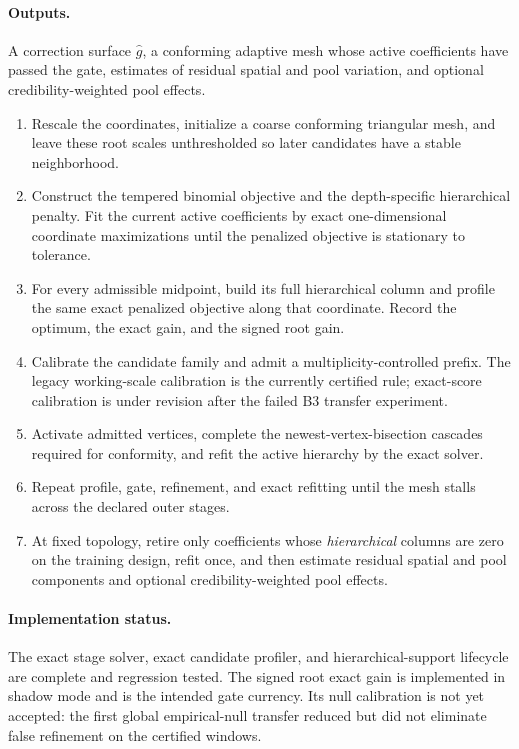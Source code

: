 \documentclass[11pt]{article}
\begin{document}
\paragraph{Outputs.} A correction surface $\hat g$, a conforming adaptive mesh whose active
coefficients have passed the gate, estimates of residual spatial and pool variation, and optional
credibility-weighted pool effects.

\begin{enumerate}[leftmargin=2em,itemsep=2pt]
\item Rescale the coordinates, initialize a coarse conforming triangular mesh, and leave these root
scales unthresholded so later candidates have a stable neighborhood.
\item Construct the tempered binomial objective and the depth-specific hierarchical penalty. Fit the
current active coefficients by exact one-dimensional coordinate maximizations until the penalized
objective is stationary to tolerance.
\item For every admissible midpoint, build its full hierarchical column and profile the same exact
penalized objective along that coordinate. Record the optimum, the exact gain, and the signed root
gain.
\item Calibrate the candidate family and admit a multiplicity-controlled prefix. The legacy
working-scale calibration is the currently certified rule; exact-score calibration is under
revision after the failed B3 transfer experiment.
\item Activate admitted vertices, complete the newest-vertex-bisection cascades required for
conformity, and refit the active hierarchy by the exact solver.
\item Repeat profile, gate, refinement, and exact refitting until the mesh stalls across the declared
outer stages.
\item At fixed topology, retire only coefficients whose \emph{hierarchical} columns are zero on the
training design, refit once, and then estimate residual spatial and pool components and optional
credibility-weighted pool effects.
\end{enumerate}

\paragraph{Implementation status.} The exact stage solver, exact candidate profiler, and
hierarchical-support lifecycle are complete and regression tested. The signed root exact gain is
implemented in shadow mode and is the intended gate currency. Its null calibration is not yet
accepted: the first global empirical-null transfer reduced but did not eliminate false refinement on
the certified windows.
\end{document}
